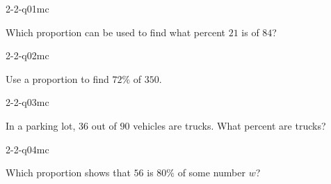 

\begin{practiceQuestion}{2-2-q01}{mc}
\begin{questionText}
Which proportion can be used to find what percent $21$ is of $84$?
\end{questionText}
\end{practiceQuestion}

\begin{practiceQuestion}{2-2-q02}{mc}
\begin{questionText}
Use a proportion to find $72\%$ of $350$.
\end{questionText}
\end{practiceQuestion}

\begin{practiceQuestion}{2-2-q03}{mc}
\begin{questionText}
In a parking lot, $36$ out of $90$ vehicles are trucks. What percent are trucks?
\end{questionText}
\end{practiceQuestion}

\begin{practiceQuestion}{2-2-q04}{mc}
\begin{questionText}
Which proportion shows that $56$ is $80\%$ of some number $w$?
\end{questionText}
\end{practiceQuestion}


